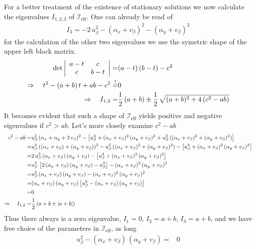\documentclass{article}
\begin{document}
For a better treatment of the existence of stationary solutions we now calculate the eigenvalues $I_{1,2,3}$ of $\mathcal{I}_\text{eff}$. One can already be read of 
\begin{align*}
     I_3=-2\,u_\beta^2-(\alpha_x+v_\beta)^2- (\alpha_y+v_\beta)^2
\end{align*}
for the calculation of the other two eigenvalues we use the symetric shape of the upper left block matrix.
\begin{align*}
    \det\left| \begin{array}{cc}
         a-t&c\\
         c&b-t
    \end{array} \right|=&(a-t)\,(b-t)-c^2\\
    \Rightarrow\quad t^2-(a+b)\,t+ab-c^2\overset{!}{=}&0\\
    \Rightarrow\quad I_{1,2}=&\frac{1}{2}\,(a+b)\pm\frac{1}{2}\,\sqrt{(a+b)^2+4\,(c^2-ab)}
\end{align*}
It becomes evident that such a shape of $\mathcal{I}_\text{eff}$ yields positive and negative eigenvalues if $c^2>ab$. Let's more closely examine $c^2-ab$
\begin{align*}
    c^2-ab=&u_\beta^2\,(\alpha_x+\alpha_y+2\,v_\beta)^2-\left[ u_\beta^4+ (\alpha_x+v_\beta)^2\,(\alpha_y+v_\beta)^2+u_\beta^2\,((\alpha_x+v_\beta)^2+(\alpha_y+v_\beta)^2) \right]\\
    =&u_\beta^2\,((\alpha_x+v_\beta)+(\alpha_y+v_\beta))^2-u_\beta^2\,((\alpha_x+v_\beta)^2+(\alpha_y+v_\beta)^2) -\left[ u_\beta^4+ (\alpha_x+v_\beta)^2\,(\alpha_y+v_\beta)^2\right]\\
    =&2\,u_\beta^2\,(\alpha_x+v_\beta)\,(\alpha_y+v_\beta)-\left[ u_\beta^4+ (\alpha_x+v_\beta)^2\,(\alpha_y+v_\beta)^2\right]\\
    =&u_\beta^2\,\left[2\,(\alpha_x+v_\beta)\,(\alpha_y+v_\beta)- u_\beta^2\right]- (\alpha_x+v_\beta)^2\,(\alpha_y+v_\beta)^2\\
    =&u_\beta^2\,(\alpha_x+v_\beta)\,(\alpha_y+v_\beta)- (\alpha_x+v_\beta)^2\,(\alpha_y+v_\beta)^2\\
    =&(\alpha_x+v_\beta)\,(\alpha_y+v_\beta)\left[u_\beta^2- (\alpha_x+v_\beta)\,(\alpha_y+v_\beta) \right]\\
    =&0\\
    \Rightarrow\quad I_{1,2}=&\frac{1}{2}\,(a+b\pm|a+b|)
\end{align*}
Thus there always is a zero eigenvalue, $I_1=0$, $I_2=a+b$, $I_3=a+b$, and we have free choice of the parameters in $\mathcal{I}_\text{eff}$, as long
\begin{align*}
    u_\beta^2-(\alpha_x+v_\beta)\,(\alpha_y+v_\beta)=&0
\end{align*}
\end{document}
